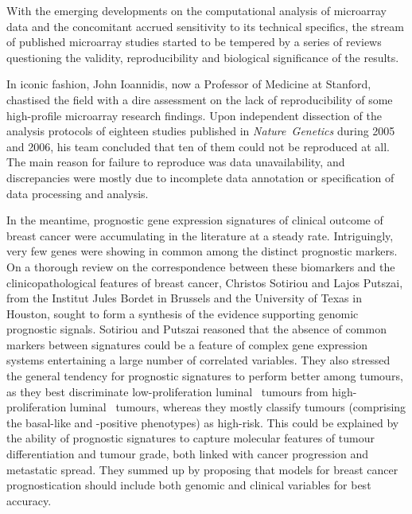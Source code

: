 With the emerging developments on the computational analysis of microarray
data\cite{quackenbush_computational_2001,irizarry_summaries_2003} and the
concomitant accrued sensitivity to its technical specifics, the stream of
published microarray studies started to be tempered by a series of reviews
questioning the validity, reproducibility and biological significance of the
results.\cite{michiels_prediction_2005,tinker_challenges_2006,kawasaki_end_2006,cahan_meta-analysis_2007,gusnanto_identification_2007,mathoulin-pelissier_survival_2008,kim_expectations_2010}

In iconic fashion, John Ioannidis, now a Professor of Medicine at Stanford,
chastised the field with a dire assessment on the lack of reproducibility of
some \mbox{high-profile} microarray research
findings.\cite{ioannidis_repeatability_2009} Upon independent dissection of the
analysis protocols of eighteen studies published in \mbox{\emph{Nature
    Genetics}} during 2005 and 2006, his team concluded that ten of them could
not be reproduced at all.  The main reason for failure to reproduce was data
unavailability, and discrepancies were mostly due to incomplete data annotation
or specification of data processing and analysis.

In the meantime, prognostic gene expression signatures of clinical outcome of
breast cancer were accumulating in the literature at a steady
rate.\cite{vant_veer_gene_2002,paik_multigene_2004,ma_two-gene_2004,wang_gene-expression_2005,chang_robustness_2005,miller_expression_2005,glinsky_microarray_2005,foekens_multicenter_2006,naderi_gene-expression_2006,teschendorff_consensus_2006,sotiriou_gene_2006,liu_prognostic_2007}
Intriguingly, very few genes were showing in common among the distinct
prognostic markers.  On a thorough review on the correspondence between these
biomarkers and the clinicopathological features of breast cancer, Christos
Sotiriou and Lajos Putszai, from the Institut Jules Bordet in Brussels and the
University of Texas in Houston, sought to form a synthesis of the evidence
supporting genomic prognostic signals.\cite{sotiriou_gene-expression_2009}
Sotiriou and Putszai reasoned that the absence of common markers between
signatures could be a feature of complex gene expression systems entertaining a
large number of correlated variables.  They also stressed the general tendency
for prognostic signatures to perform better among  tumours, as
they best discriminate \mbox{low-proliferation} \mbox{luminal }
tumours from \mbox{high-proliferation} \mbox{luminal } tumours,
whereas they mostly classify  tumours (comprising the basal-like
and \mbox{-positive} phenotypes) as \mbox{high-risk}.  This could
be explained by the ability of prognostic signatures to capture molecular
features of tumour differentiation and tumour grade, both linked with cancer
progression and metastatic spread.  They summed up by proposing that models for
breast cancer prognostication should include both genomic and clinical variables
for best accuracy.

